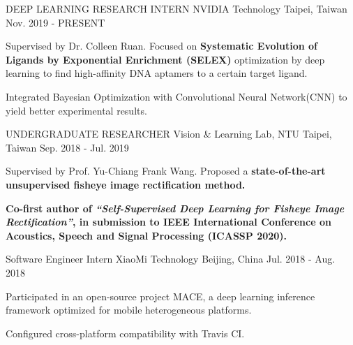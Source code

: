 

\begin{cventries}

\cventry
    {DEEP LEARNING RESEARCH INTERN} %
    {NVIDIA Technology} %
    {Taipei, Taiwan} %
    {Nov. 2019 - PRESENT} %
    {
      \begin{cvitems} %
        \item {Supervised by Dr. Colleen Ruan. Focused on \textbf{Systematic Evolution of Ligands by Exponential Enrichment (SELEX)} optimization by deep learning to find high-affinity DNA aptamers to a certain target ligand.}
        \item {Integrated Bayesian Optimization with Convolutional Neural Network(CNN) to yield better experimental results.}
      \end{cvitems}
    }

\cventry
    {UNDERGRADUATE RESEARCHER} %
    {Vision \& Learning Lab, NTU} %
    {Taipei, Taiwan} %
    {Sep. 2018 - Jul. 2019} %
    {
      \begin{cvitems} %
        \item {Supervised by Prof. Yu-Chiang Frank Wang. Proposed a \textbf{state-of-the-art unsupervised fisheye image rectification method.}}
        \item {\textbf{Co-first author of \textit{“Self-Supervised Deep Learning for Fisheye Image Rectification”}, in submission to IEEE International Conference on Acoustics, Speech and Signal Processing (ICASSP 2020).}}
      \end{cvitems}
    }



  \cventry
    {Software Engineer Intern} %
    {XiaoMi Technology} %
    {Beijing, China} %
    {Jul. 2018 - Aug. 2018} %
    {
      \begin{cvitems} %
        \item {Participated in an open-source project MACE, a deep learning inference framework optimized for mobile heterogeneous platforms.}
        \item {Configured cross-platform compatibility with Travis CI.}
      \end{cvitems}
    }

\end{cventries}
